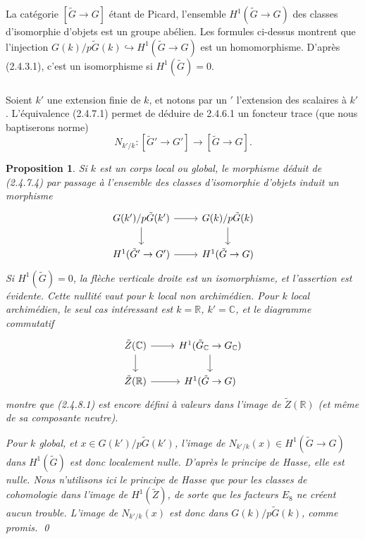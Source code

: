 \documentclass[12pt,a4paper]{article}
\theoremstyle{plain}
\newtheorem{proposition}[theorem]{Proposition}
\theoremstyle{definition}
\theoremstyle{remark}
\newcommand{\RR}{\mathbb{R}}
\newcommand{\CC}{\mathbb{C}}
\begin{document}
La cat\'egorie $[\tilde{G} \to G]$ \'etant de Picard, l'ensemble $H^1(\tilde{G} \to G)$ des classes d'isomorphie d'objets est un groupe ab\'elien. Les formules ci-dessus montrent que l'injection $G(k)/p\tilde{G}(k) \hookrightarrow H^1(\tilde{G} \to G)$ est un homomorphisme. D'apr\`es (2.4.3.1), c'est un isomorphisme si $H^1(\tilde{G}) = 0$.

\subsubsection{}

Soient $k'$ une extension finie de $k$, et notons par un $'$ l'extension des scalaires \`a $k'$. L'\'equivalence (2.4.7.1) permet de d\'eduire de 2.4.6.1 un foncteur trace (que nous baptiserons norme)
\begin{equation}\label{eq:2.4.7.4}
N_{k'/k}: [\tilde{G}' \to G'] \to [\tilde{G} \to G].
\end{equation}

\begin{proposition}
Si $k$ est un corps local ou global, le morphisme d\'eduit de (2.4.7.4) par passage \`a l'ensemble des classes d'isomorphie d'objets induit un morphisme
\begin{equation}\label{eq:2.4.8.1}
\begin{tikzcd}
G(k')/p\tilde{G}(k') \arrow[r] \arrow[d] & G(k)/p\tilde{G}(k) \arrow[d] \\
H^1(\tilde{G}' \to G') \arrow[r] & H^1(\tilde{G} \to G)
\end{tikzcd}
\end{equation}
Si $H^1(\tilde{G}) = 0$, la fl\`eche verticale droite est un isomorphisme, et l'assertion est \'evidente. Cette nullit\'e vaut pour $k$ local non archim\'edien. Pour $k$ local archim\'edien, le seul cas int\'eressant est $k = \RR$, $k' = \CC$, et le diagramme commutatif
\[
\begin{tikzcd}
\tilde{Z}(\CC) \arrow[r] \arrow[d] & H^1(\tilde{G}_{\CC} \to G_{\CC}) \arrow[d] \\
\tilde{Z}(\RR) \arrow[r] & H^1(\tilde{G} \to G)
\end{tikzcd}
\]
montre que (2.4.8.1) est encore d\'efini \`a valeurs dans l'image de $\tilde{Z}(\RR)$ (et m\^eme de sa composante neutre).

Pour $k$ global, et $x \in G(k')/p\tilde{G}(k')$, l'image de $N_{k'/k}(x) \in H^1(\tilde{G} \to G)$ dans $H^1(\tilde{G})$ est donc localement nulle. D'apr\`es le principe de Hasse, elle est nulle. Nous n'utilisons ici le principe de Hasse que pour les classes de cohomologie dans l'image de $H^1(\tilde{Z})$, de sorte que les facteurs $E_8$ ne cr\'eent aucun trouble. L'image de $N_{k'/k}(x)$ est donc dans $G(k)/p\tilde{G}(k)$, comme promis.
\qed
\end{proposition}
\end{document}
